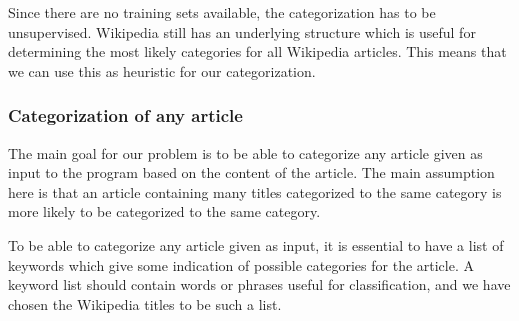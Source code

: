 Since there are no training sets available, the categorization has to be unsupervised. Wikipedia still has an underlying structure which is useful for determining the most likely categories for all Wikipedia articles. This means that we can use this as heuristic for our categorization. 


\subsubsection{Categorization of any article}
The main goal for our problem is to be able to categorize any article given as input to the program based on the content of the article. The main assumption here is that an article containing many titles categorized to the same category is more likely to be categorized to the same category. 

To be able to categorize any article given as input, it is essential to have a list of keywords which give some indication of possible categories for the article. A keyword list should contain words or phrases useful for classification, and we have chosen the Wikipedia titles to be such a list. 





